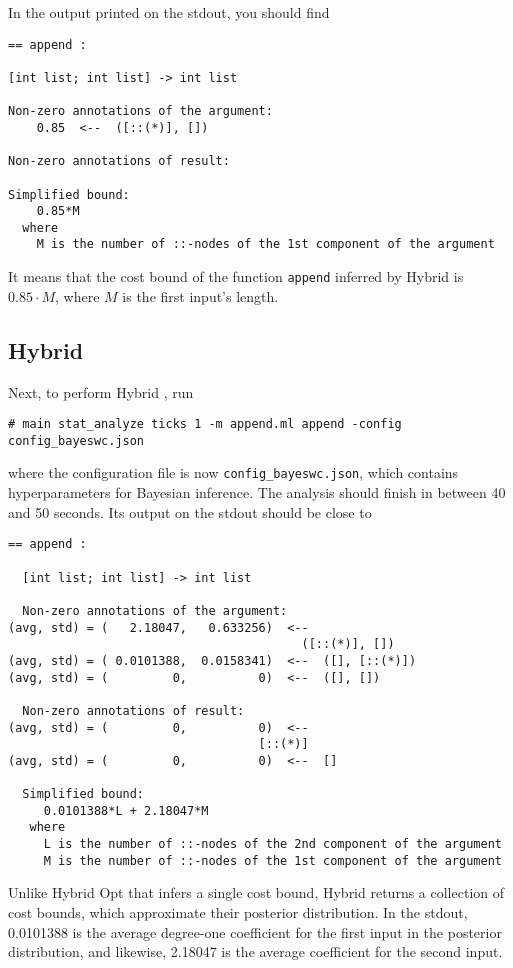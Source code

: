 In the output printed on the stdout, you should find
\begin{verbatim}
== append :

[int list; int list] -> int list

Non-zero annotations of the argument:
    0.85  <--  ([::(*)], [])

Non-zero annotations of result:

Simplified bound:
    0.85*M
  where
    M is the number of ::-nodes of the 1st component of the argument
\end{verbatim}
%
It means that the cost bound of the function \texttt{append} inferred by Hybrid
\Opt{} is $0.85 \cdot M$, where $M$ is the first input's length.

\subsection{Hybrid \BayesWC{}}

Next, to perform Hybrid \BayesWC{}, run
\begin{verbatim}
# main stat_analyze ticks 1 -m append.ml append -config config_bayeswc.json
\end{verbatim}
where the configuration file is now \texttt{config\_bayeswc.json}, which
contains hyperparameters for Bayesian inference.
%
The analysis should finish in between 40 and 50 seconds.
%
Its output on the stdout should be close to
\begin{verbatim}
== append :

  [int list; int list] -> int list

  Non-zero annotations of the argument:
(avg, std) = (   2.18047,   0.633256)  <--
                                         ([::(*)], [])
(avg, std) = ( 0.0101388,  0.0158341)  <--  ([], [::(*)])
(avg, std) = (         0,          0)  <--  ([], [])

  Non-zero annotations of result:
(avg, std) = (         0,          0)  <--
                                   [::(*)]
(avg, std) = (         0,          0)  <--  []

  Simplified bound:
     0.0101388*L + 2.18047*M
   where
     L is the number of ::-nodes of the 2nd component of the argument
     M is the number of ::-nodes of the 1st component of the argument
\end{verbatim}
%
Unlike Hybrid Opt{} that infers a single cost bound, Hybrid \BayesWC{} returns a
collection of cost bounds, which approximate their posterior distribution.
%
In the stdout, 0.0101388 is the average degree-one coefficient for the first
input in the posterior distribution, and likewise, 2.18047 is the average
coefficient for the second input.

